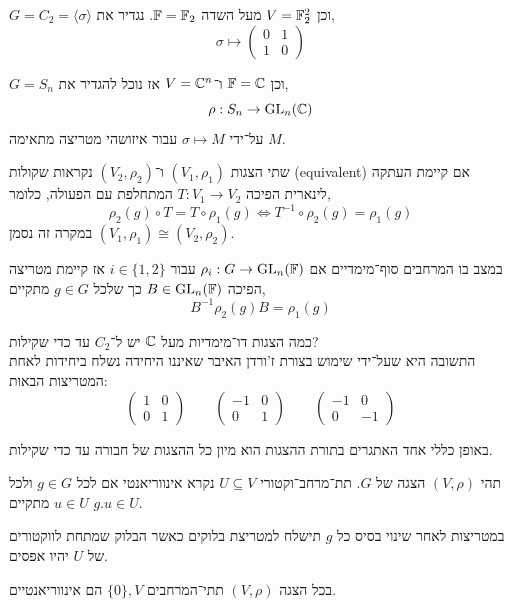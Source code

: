 \begin{example}
	$G = C_2 = \langle \sigma \rangle$ וכן $V = \mathbb{F}_2^2$ מעל השדה $\mathbb{F} = \mathbb{F}_2$.
	נגדיר את,
	\[
		\sigma \mapsto
		\begin{pmatrix}
			0 & 1 \\
			1 & 0
		\end{pmatrix}
	\]
\end{example}
\begin{example}
	$G = S_n$ וכן $\mathbb{F} = \mathbb{C}$ ו־$V = \mathbb{C}^n$ אז נוכל להגדיר את,
	\[
		\rho : S_n \to \operatorname{GL}_n(\mathbb{C})
	\]
	על־ידי $\sigma \mapsto M$ עבור איזושהי מטריצה מתאימה $M$.
\end{example}
\begin{definition}
	שתי הצגות $(V_1, \rho_1)$ ו־$(V_2, \rho_2)$ נקראות שקולות (equivalent) אם קיימת העתקה לינארית הפיכה $T : V_1 \to V_2$ המתחלפת עם הפעולה, כלומר,
	\[
		\rho_2(g) \circ T
		= T \circ \rho_1(g)
		\iff T^{-1} \circ \rho_2(g) = \rho_1(g)
	\]
	במקרה זה נסמן $(V_1, \rho_1) \cong (V_2, \rho_2)$.
\end{definition}
במצב בו המרחבים סוף־מימדיים אם $\rho_i : G \to \operatorname{GL}_n(\mathbb{F})$ עבור $i \in \{1, 2\}$ אז קיימת מטריצה הפיכה $B \in \operatorname{GL}_n(\mathbb{F})$ כך שלכל $g \in G$ מתקיים,
\[
	B^{-1} \rho_2(g) B = \rho_1(g)
\]
\begin{example}
	כמה הצגות דו־מימדיות מעל $\mathbb{C}$ יש ל־$C_2$ עד כדי שקילות? \\
	התשובה היא שעל־ידי שימוש בצורת ז'ורדן האיבר שאיננו היחידה נשלח ביחידות לאחת המטריצות הבאות:
	\[
		\begin{pmatrix}
			1 & 0 \\
			0 & 1
		\end{pmatrix}
		\qquad
		\begin{pmatrix}
			-1 & 0 \\
			0 & 1
		\end{pmatrix}
		\qquad
		\begin{pmatrix}
			-1 & 0 \\
			0 & -1
		\end{pmatrix}
	\]
\end{example}
באופן כללי אחד האתגרים בתורת ההצגות הוא מיון כל ההצגות של חבורה עד כדי שקילות.
\begin{definition}
	תהי $(V, \rho)$ הצגה של $G$. תת־מרחב־וקטורי $U \subseteq V$ נקרא אינווריאנטי אם לכל $g \in G$ ולכל $u \in U$ מתקיים $g . u \in U$.
\end{definition}
במטריצות לאחר שינוי בסיס כל $g$ תישלח למטריצת בלוקים כאשר הבלוק שמתחת לווקטורים של $U$ יהיו אפסים.
\begin{example}
	בכל הצגה $(V, \rho)$ תתי־המרחבים $\{ 0 \}, V$ הם אינווריאנטיים.
\end{example}
